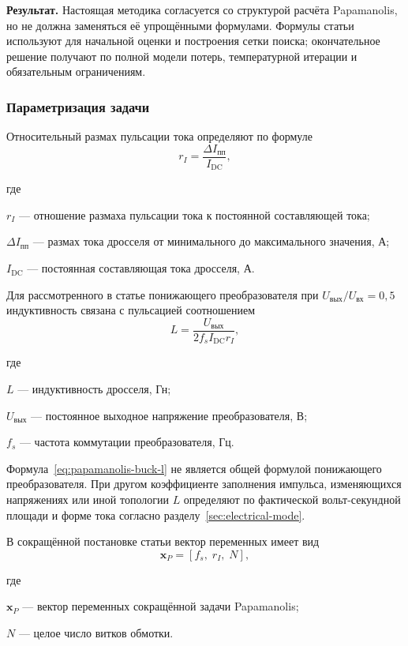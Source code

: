 \documentclass[14pt,a4paper]{extarticle}
\newcommand{\result}{\par\noindent\textbf{Результат.} }
\newenvironment{whereblock}
 {\par\noindent где\par
  \begin{list}{}{\setlength{\leftmargin}{12.5mm}
                  \setlength{\itemindent}{-12.5mm}
                  \setlength{\itemsep}{0pt}
                  \setlength{\parsep}{0pt}
                  \setlength{\topsep}{0pt}}}
 {\end{list}}
\newcommand{\whereitem}[2]{\item[] #1 --- #2}
\begin{document}
\result Настоящая методика согласуется со структурой расчёта
Papamanolis, но не должна заменяться её упрощёнными формулами. Формулы
статьи используют для начальной оценки и построения сетки поиска;
окончательное решение получают по полной модели потерь, температурной
итерации и обязательным ограничениям.

\subsubsection{Параметризация задачи}

Относительный размах пульсации тока определяют по формуле
\begin{equation}
 r_I=
 \frac{\Delta I_{\text{пп}}}{I_{\text{DC}}},
 \label{eq:papamanolis-ripple}
\end{equation}
\begin{whereblock}
\whereitem{$r_I$}{отношение размаха пульсации тока к постоянной
составляющей тока;}
\whereitem{$\Delta I_{\text{пп}}$}{размах тока дросселя от минимального
до максимального значения, А;}
\whereitem{$I_{\text{DC}}$}{постоянная составляющая тока дросселя, А.}
\end{whereblock}

Для рассмотренного в статье понижающего преобразователя при
$U_{\text{вых}}/U_{\text{вх}}=0{,}5$ индуктивность связана с пульсацией
соотношением
\begin{equation}
 L=
 \frac{U_{\text{вых}}}
 {2f_s I_{\text{DC}}r_I},
 \label{eq:papamanolis-buck-l}
\end{equation}
\begin{whereblock}
\whereitem{$L$}{индуктивность дросселя, Гн;}
\whereitem{$U_{\text{вых}}$}{постоянное выходное напряжение
преобразователя, В;}
\whereitem{$f_s$}{частота коммутации преобразователя, Гц.}
\end{whereblock}

Формула~\eqref{eq:papamanolis-buck-l} не является общей формулой
понижающего преобразователя. При другом коэффициенте заполнения импульса,
изменяющихся напряжениях или иной топологии $L$ определяют по фактической
вольт-секундной площади и форме тока согласно
разделу~\ref{sec:electrical-mode}.

В сокращённой постановке статьи вектор переменных имеет вид
\begin{equation}
 \mathbf x_P=[f_s,\;r_I,\;N],
 \label{eq:papamanolis-vector}
\end{equation}
\begin{whereblock}
\whereitem{$\mathbf x_P$}{вектор переменных сокращённой задачи
Papamanolis;}
\whereitem{$N$}{целое число витков обмотки.}
\end{whereblock}
\end{document}
